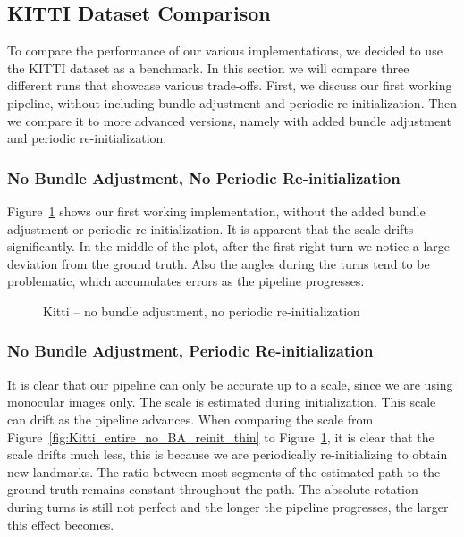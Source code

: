 \documentclass[11pt]{article}
\newlength\figureheight
\newlength\figurewidth
\begin{document}
\subsection{KITTI Dataset Comparison}
To compare the performance of our various implementations, we decided to use the KITTI dataset as a benchmark. In this section we will compare three different runs that showcase various trade-offs. First, we discuss our first working pipeline, without including bundle adjustment and periodic re-initialization. Then we compare it to more advanced versions, namely with added bundle adjustment and periodic re-initialization.

\subsubsection{No Bundle Adjustment, No Periodic Re-initialization}
Figure~\ref{fig:Kitti_entire_no_BA_no_reinit_thin} shows our first working implementation, without the added bundle adjustment or periodic re-initialization. It is apparent that the scale drifts significantly. In the middle of the plot, after the first right turn we notice a large deviation from the ground truth. Also the angles during the turns tend to be problematic, which accumulates errors as the pipeline progresses.

\begin{figure}[!htb]
	\centering
	\setlength\figureheight{7.5cm} 
	\setlength\figurewidth{11cm}
	
	\caption{Kitti -- no bundle adjustment, no periodic re-initialization}
	\label{fig:Kitti_entire_no_BA_no_reinit_thin}
\end{figure}

\subsubsection{No Bundle Adjustment, Periodic Re-initialization}
It is clear that our pipeline can only be accurate up to a scale, since we are using monocular images only. The scale is estimated during initialization. This scale can drift as the pipeline advances. When comparing the scale from Figure~\ref{fig:Kitti_entire_no_BA_reinit_thin} to Figure~\ref{fig:Kitti_entire_no_BA_no_reinit_thin}, it is clear that the scale drifts much less, this is because we are periodically re-initializing to obtain new landmarks. The ratio between most segments of the estimated path to the ground truth remains constant throughout the path. The absolute rotation during turns is still not perfect and the longer the pipeline progresses, the larger this effect becomes.
\end{document}
